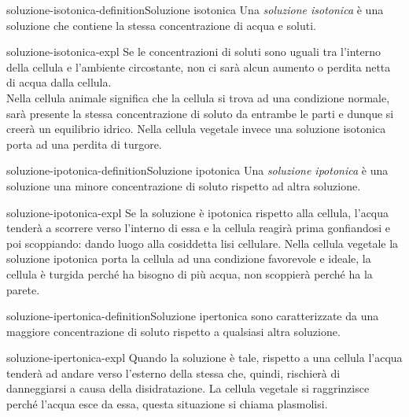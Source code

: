 \documentclass[preview]{standalone}
\begin{document}
\begin{snippetdefinition}{soluzione-isotonica-definition}{Soluzione isotonica}
    Una \textit{soluzione isotonica} è una soluzione che contiene la stessa
    concentrazione di acqua e soluti.
\end{snippetdefinition}

\begin{snippet}{soluzione-isotonica-expl}
    Se le concentrazioni di soluti sono
    uguali tra l'interno della cellula e l'ambiente circostante, non ci sarà
    alcun aumento o perdita netta di acqua dalla cellula. \\
    Nella cellula animale significa che la cellula si trova ad
    una condizione normale, sarà presente la stessa concentrazione di soluto
    da entrambe le parti e dunque si creerà un equilibrio idrico. Nella cellula
    vegetale invece una soluzione isotonica porta ad una perdita di turgore.
\end{snippet}

\begin{snippetdefinition}{soluzione-ipotonica-definition}{Soluzione ipotonica}
    Una \textit{soluzione ipotonica} è una soluzione una minore concentrazione di soluto rispetto ad
    altra soluzione.
\end{snippetdefinition}

\begin{snippet}{soluzione-ipotonica-expl}
    Se la soluzione è ipotonica rispetto alla cellula, l'acqua tenderà a scorrere verso
    l'interno di essa e la cellula reagirà prima gonfiandosi e poi scoppiando: dando luogo alla cosiddetta lisi
    cellulare. Nella cellula vegetale la soluzione ipotonica porta la cellula ad una condizione favorevole e
    ideale, la cellula è turgida perché ha bisogno di più acqua, non scoppierà perché ha la parete.
\end{snippet}

\begin{snippetdefinition}{soluzione-ipertonica-definition}{Soluzione ipertonica}
    sono caratterizzate da una maggiore concentrazione di soluto rispetto a
    qualsiasi altra soluzione.
\end{snippetdefinition}

\begin{snippet}{soluzione-ipertonica-expl}
    Quando la soluzione è tale, rispetto a una cellula l'acqua tenderà ad andare
    verso l'esterno della stessa che, quindi, rischierà di danneggiarsi a causa della disidratazione. La cellula
    vegetale si raggrinzisce perché l'acqua esce da essa, questa situazione si chiama plasmolisi.
\end{snippet}
\end{document}
